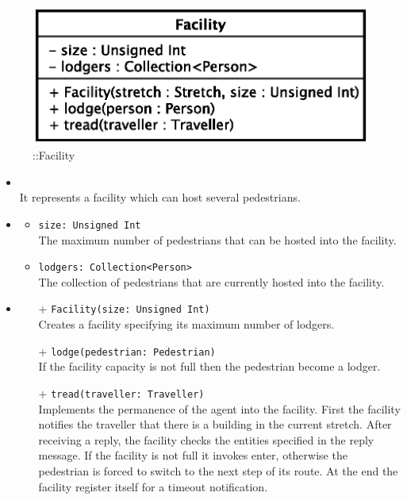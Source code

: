\begin{figure}[h]
\centering
\includegraphics[scale=0.6,keepaspectratio]{images/solution/app/backend/facility.eps}
\caption{\pReactiveComponentStretchDecoration::Facility}
\label{fig:sd-app-facility}
\end{figure}
\FloatBarrier
\begin{itemize}
  \item \textbf{\descr} \\
    It represents a facility which can host several pedestrians.
  \item \textbf{\attrs}
  \begin{itemize}
    \item \texttt{size: Unsigned Int} \\
The maximum number of pedestrians that can be hosted into the facility.
    \item \texttt{lodgers: Collection<Person>} \\
The collection of pedestrians that are currently hosted into the facility.
  \end{itemize}
  \item \textbf{\ops}
  \begin{itemize} 
   \item[+] \texttt{Facility(size: Unsigned Int)} \\
Creates a facility specifying its maximum number of lodgers.
   \item[+] \texttt{lodge(pedestrian: Pedestrian)} \\
If the facility capacity is not full then the pedestrian become a lodger.   
\item[+] \texttt{tread(traveller: Traveller)} \\
Implements the permanence of the agent into the facility. First the facility notifies the traveller that there is a building in the current stretch. After receiving a reply, the facility checks the entities specified in the reply message. If the facility is not full it invokes enter, otherwise the pedestrian is forced to switch to the next step of its route. At the end the facility register itself for a timeout notification.
  \end{itemize}
\end{itemize}
